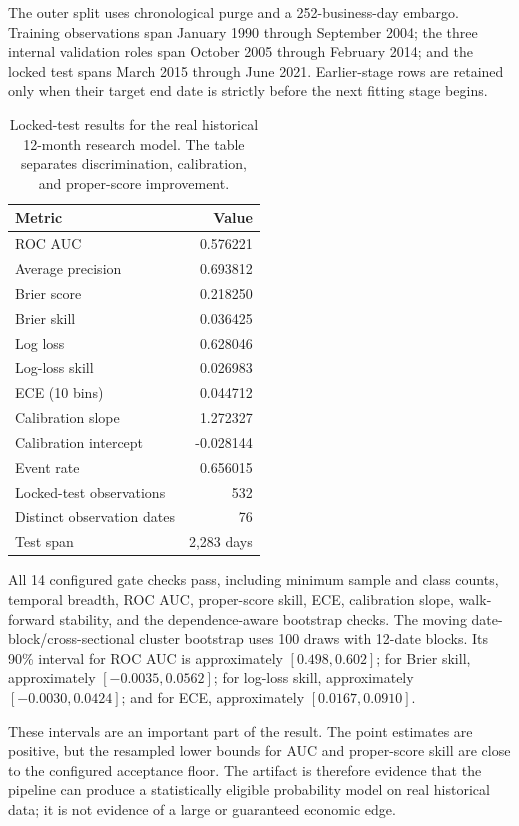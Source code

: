 \documentclass[11pt]{article}
\begin{document}
The outer split uses chronological purge and a 252-business-day embargo. Training observations span January 1990 through September 2004; the three internal validation roles span October 2005 through February 2014; and the locked test spans March 2015 through June 2021. Earlier-stage rows are retained only when their target end date is strictly before the next fitting stage begins.

\begin{table}[tbp]
\centering
\small
\caption{Locked-test results for the real historical 12-month research model. The table separates discrimination, calibration, and proper-score improvement.}
\label{tab:realmodelresults}
\begin{tabular}{@{}lr@{}}
\toprule
Metric & Value \\
\midrule
ROC AUC & 0.576221 \\
Average precision & 0.693812 \\
Brier score & 0.218250 \\
Brier skill & 0.036425 \\
Log loss & 0.628046 \\
Log-loss skill & 0.026983 \\
ECE (10 bins) & 0.044712 \\
Calibration slope & 1.272327 \\
Calibration intercept & -0.028144 \\
Event rate & 0.656015 \\
Locked-test observations & 532 \\
Distinct observation dates & 76 \\
Test span & 2,283 days \\
\bottomrule
\end{tabular}
\end{table}

All 14 configured gate checks pass, including minimum sample and class counts, temporal breadth, ROC AUC, proper-score skill, ECE, calibration slope, walk-forward stability, and the dependence-aware bootstrap checks. The moving date-block/cross-sectional cluster bootstrap uses 100 draws with 12-date blocks. Its 90\% interval for ROC AUC is approximately $[0.498,0.602]$; for Brier skill, approximately $[-0.0035,0.0562]$; for log-loss skill, approximately $[-0.0030,0.0424]$; and for ECE, approximately $[0.0167,0.0910]$.

These intervals are an important part of the result. The point estimates are positive, but the resampled lower bounds for AUC and proper-score skill are close to the configured acceptance floor. The artifact is therefore evidence that the pipeline can produce a statistically eligible probability model on real historical data; it is not evidence of a large or guaranteed economic edge.
\end{document}
